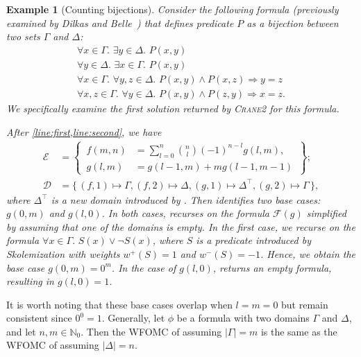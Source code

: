 \documentclass{article}
\newtheorem{example}{Example}
\theoremstyle{remark}
\newcommand{\Cranetwo}{\textsc{Crane2}}
\begin{document}
\begin{example}[Counting bijections]\label{example:overall}
  Consider the following formula (previously examined by Dilkas and
  Belle~) that defines predicate $P$ as a
  bijection between two sets $\Gamma$ and $\Delta$:
  \[
    \begin{gathered}
      \forall x \in \Gamma\text{. }\exists y \in \Delta\text{. }P(x, y)\\
      \forall y \in \Delta\text{. }\exists x \in \Gamma\text{. }P(x, y)\\
      \forall x \in \Gamma\text{. }\forall y, z \in \Delta\text{. }P(x, y) \land P(x, z) \Rightarrow y = z\\
      \forall x, z \in \Gamma\text{. }\forall y \in \Delta\text{. }P(x, y) \land P(z, y) \Rightarrow x = z.
    \end{gathered}
  \]
  We specifically examine the first solution returned by \Cranetwo{} for this
  formula.

  After \cref{line:first,line:second}, we have
  \begin{align*}
    \mathcal{E} &= \left\{\,\begin{aligned}f(m, n) &= \sum_{l=0}^{n} \binom{n}{l}{(-1)}^{n-l}g(l, m),\\ g(l, m) &= g(l-1, m) + mg(l-1, m-1)\end{aligned}\,\right\};\\
    \mathcal{D} &= \{\, (f, 1) \mapsto \Gamma, (f, 2) \mapsto \Delta, (g, 1) \mapsto \Delta^{\top}, (g, 2) \mapsto \Gamma \,\},
  \end{align*}
  where $\Delta^{\top}$ is a new domain introduced by \Compile. Then
  \FindBaseCases identifies two base cases: $g(0, m)$ and $g(l, 0)$. In both
  cases, \CompileWithBaseCases recurses on the formula $\mathcal{F}(g)$
  simplified by assuming that one of the domains is empty. In the first case, we
  recurse on the formula $\forall x \in \Gamma\text{. }S(x) \lor \neg S(x)$,
  where $S$ is a predicate introduced by Skolemization with weights
  $w^{+}(S) = 1$ and $w^{-}(S) = -1$. Hence, we obtain the base case
  $g(0, m) = 0^{m}$. In the case of $g(l, 0)$, 
  returns an empty formula, resulting in $g(l, 0) = 1$.
\end{example}

It is worth noting that these base cases overlap when $l = m = 0$ but remain
consistent since $0^{0} = 1$. Generally, let $\phi$ be a formula with two
domains $\Gamma$ and $\Delta$, and let $n, m \in \mathbb{N}_{0}$. Then the WFOMC
of  assuming $|\Gamma| = m$ is the same as the
WFOMC of  assuming $|\Delta| = n$.
\end{document}
